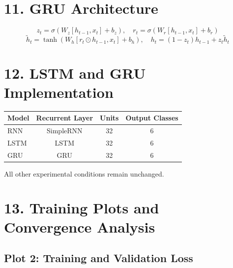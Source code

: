 \documentclass[10pt]{article}
\begin{document}
\section*{11. GRU Architecture}

\[
z_t=\sigma(W_z[h_{t-1},x_t]+b_z),\quad
r_t=\sigma(W_r[h_{t-1},x_t]+b_r)
\]
\[
\tilde{h}_t=\tanh(W_h[r_t\odot h_{t-1},x_t]+b_h),\quad
h_t=(1-z_t)h_{t-1}+z_t\tilde{h}_t
\]

\begin{center}
\end{center}

\section*{12. LSTM and GRU Implementation}

\begin{center}
\begin{tabular}{|l|c|c|c|}
\hline
Model & Recurrent Layer & Units & Output Classes\\
\hline
RNN & SimpleRNN & 32 & 6\\
LSTM & LSTM & 32 & 6\\
GRU & GRU & 32 & 6\\
\hline
\end{tabular}
\end{center}

All other experimental conditions remain unchanged.

\section*{13. Training Plots and Convergence Analysis}

\subsection*{Plot 2: Training and Validation Loss}
\end{document}
